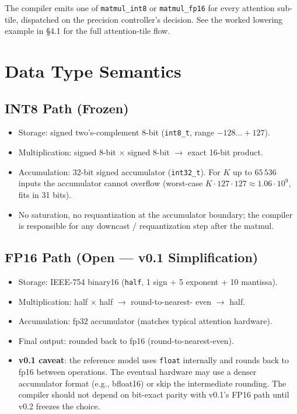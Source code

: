 \documentclass[11pt]{article}
\begin{document}
\noindent
The compiler emits one of \texttt{matmul\_int8} or \texttt{matmul\_fp16}
for every attention sub-tile, dispatched on the precision controller's
decision. See the worked lowering example in
 \S4.1 for the full
attention-tile flow.

\section{Data Type Semantics}
\label{sec:dtypes}

\subsection{INT8 Path (Frozen)}
\label{sec:int8}

\begin{itemize}
\item Storage: signed two's-complement 8-bit (\texttt{int8\_t},
      range $-128 \ldots +127$).
\item Multiplication: signed 8-bit $\times$ signed 8-bit $\rightarrow$
      exact 16-bit product.
\item Accumulation: 32-bit signed accumulator (\texttt{int32\_t}).
      For $K$ up to $65\,536$ inputs the accumulator cannot overflow
      (worst-case $K \cdot 127 \cdot 127 \approx 1.06 \cdot 10^9$,
      fits in 31 bits).
\item No saturation, no requantization at the accumulator boundary;
      the compiler is responsible for any downcast / requantization
      step after the matmul.
\end{itemize}

\subsection{FP16 Path (Open --- v0.1 Simplification)}
\label{sec:fp16}

\begin{itemize}
\item Storage: IEEE-754 binary16 (\texttt{half}, 1 sign + 5 exponent +
      10 mantissa).
\item Multiplication: half $\times$ half $\rightarrow$ round-to-nearest-
      even $\rightarrow$ half.
\item Accumulation: fp32 accumulator (matches typical attention
      hardware).
\item Final output: rounded back to fp16 (round-to-nearest-even).
\item \textbf{v0.1 caveat}: the reference model uses
      \texttt{float} internally and rounds back to fp16 between
      operations. The eventual hardware may use a denser accumulator
      format (e.g., bfloat16) or skip the intermediate rounding. The
      compiler should not depend on bit-exact parity with v0.1's FP16
      path until v0.2 freezes the choice.
\end{itemize}
\end{document}
